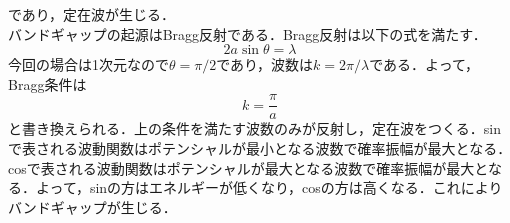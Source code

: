 \documentclass{report}
\begin{document}
  であり，定在波が生じる．\\
  バンドギャップの起源はBragg反射である．Bragg反射は以下の式を満たす．
  \begin{equation}
    2a\sin\theta=\lambda
  \end{equation}
  今回の場合は1次元なので$\theta=\pi/2$であり，波数は$k=2\pi/\lambda$である．よって，Bragg条件は
  \begin{equation}
    k=\frac{\pi}{a}
  \end{equation}
  と書き換えられる．上の条件を満たす波数のみが反射し，定在波をつくる．sinで表される波動関数はポテンシャルが最小となる波数で確率振幅が最大となる．
  cosで表される波動関数はポテンシャルが最大となる波数で確率振幅が最大となる．よって，sinの方はエネルギーが低くなり，cosの方は高くなる．これによりバンドギャップが生じる．
\end{document}
